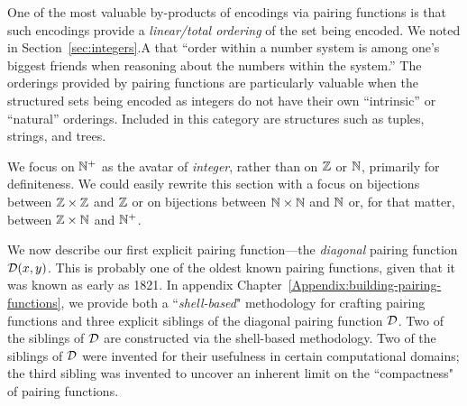 \medskip


One of the most valuable by-products of encodings via pairing functions is that such encodings provide a {\em linear/total ordering} of the set being encoded.  We noted in Section~\ref{sec:integers}.A that ``order within a number system is among one's biggest friends when reasoning about the numbers within the system.''  The orderings provided by pairing functions are particularly valuable when the structured sets being encoded as integers do not have their own ``intrinsic'' or ``natural'' orderings.  Included in this category are structures such as tuples, strings, and trees.

\bigskip

\noindent {}
\bigskip

We focus on $\mathbb{N}^+$ as the avatar of {\it integer}, rather than on $\mathbb{Z}$ or $\mathbb{N}$, primarily for definiteness.  We could easily rewrite this section with a focus on bijections between $\mathbb{Z} \times \mathbb{Z}$ and $\mathbb{Z}$ or on bijections between $\mathbb{N} \times \mathbb{N}$ and $\mathbb{N}$ or, for that matter, between $\mathbb{Z} \times \mathbb{N}$ and $\mathbb{N}^+$.

\bigskip

We now describe our first explicit pairing function---the {\em diagonal} pairing function $\mbox{$\cal D$}(x,y)$.  This is probably one of the oldest known pairing functions, given that it was known as early as 1821.   In appendix Chapter~\ref{Appendix:building-pairing-functions}, we provide both a ``{\em shell-based}" methodology for crafting pairing functions and three explicit siblings of the diagonal pairing function $\mbox{$\cal D$}$.  Two of the siblings of $\mbox{$\cal D$}$ are constructed via the shell-based methodology.  Two of the siblings of $\mbox{$\cal D$}$ were invented for their usefulness in certain computational domains; the third sibling was invented to uncover an inherent limit on the ``compactness" of pairing functions.


